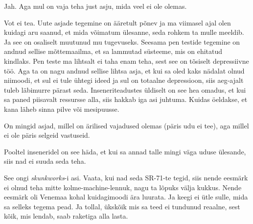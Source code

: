 
Jah. Aga mul on vaja teha just asju, mida veel ei ole olemas. 


Vot ei tea. Uute asjade tegemine on ääretult põnev ja ma  viimasel ajal olen 
kuidagi  aru saanud, et mida võimatum ülesanne, seda rohkem ta mulle meeldib. 
Ja see on osaliselt muutunud mu tugevuseks. Seesama pen testide tegemine on andnud sellise mõttemaailma, et sa lammutad süsteeme, mis 
on ehitatud kindlaks. Pen teste  ma lihtsalt ei taha enam teha, sest see on 
tõsiselt depressiivne töö. Aga ta on nagu andnud sellise lihtsa asja, et kui sa 
oled kaks nädalat olnud niimoodi, et sul ei tule ühtegi ideed ja sul on 
totaalne depressioon, siis aeg-ajalt tuleb läbimurre pärast seda. 
Inseneriteadustes üldiselt on see hea omadus, et kui sa paned piisavalt 
ressursse alla, siis hakkab iga asi juhtuma. Kuidas öeldakse, et kana läheb 
sinna pilve või mesipuusse.


On mingid asjad, millel on ärilised vajadused olemas (päris udu ei tee),  aga 
millel ei ole päris selgeid vastuseid. 

Pooltel inseneridel on see häda, et kui sa annad talle mingi väga uduse 
ülesande, siis nad ei suuda seda teha.


See ongi \emph{skunkworks}-i asi. Vaata, kui nad seda 
SR-71-te 
tegid, siis nende eesmärk ei olnud teha mitte kolme-machine-lennuk, nagu ta lõpuks välja 
kukkus. Nende eesmärk oli Venemaa kohal kuidagimoodi ära luurata. Ja keegi ei 
ütle sulle, mida sa selleks tegema pead. Ja tollal, ükskõik mis sa teed ei 
tundunud reaalne, sest  kõik, mis lendab, saab raketiga alla lasta. 

